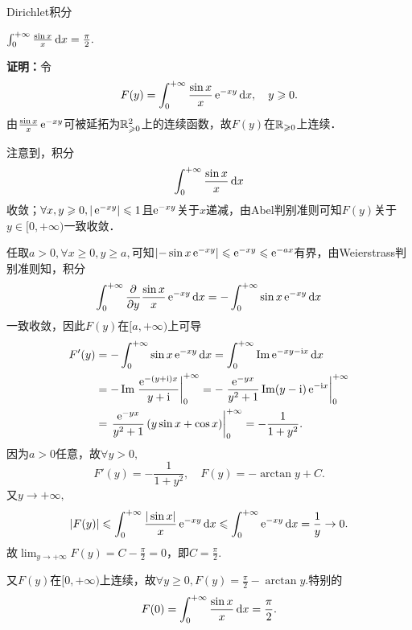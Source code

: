 \begin{example}{Dirichlet积分}{}
	\begin{center}
		$\int_0^{+\infty}\frac{\sin x}x\mathop{}\!\mathrm{d} x=\frac{\pi}2.$
	\end{center}
	\textbf{证明：}令
	\[
		F(y)=\int_0^{+\infty}\frac{\sin x}x\mathop{}\!\mathrm{e}^{-xy}\mathop{}\!\mathrm{d} x,\quad y\geqslant 0.
	\]
	由$\frac{\sin x}x\mathop{}\!\mathrm{e}^{-xy}$可被延拓为$\mathbb R_{\geqslant 0}^2$上的连续函数，故$F(y)$在$\mathbb R_{\geqslant 0}$上连续．

	注意到，积分
	\[
		\int_0^{+\infty}\frac{\sin x}x\mathop{}\!\mathrm{d} x
	\]
	收敛；$\forall x,y\geqslant 0,|\mathop{}\!\mathrm{e}^{-xy}|\leqslant 1$且$\mathop{}\!\mathrm{e}^{-xy}$关于$x$递减，由Abel判别准则可知$F(y)$关于$y\in[0,+\infty)$一致收敛．

	任取$a>0,\forall x\geqslant 0,y\geqslant a,$可知$\left|-\sin x\mathop{}\!\mathrm{e}^{-xy}\right|\leqslant \mathop{}\!\mathrm{e}^{-xy}\leqslant \mathop{}\!\mathrm{e}^{-ax}$有界，由Weierstrass判别准则知，积分
	\[
		\int_0^{+\infty}\frac{\partial^{{}}}{\partial{y}^{{}}}\frac{\sin x}x\mathop{}\!\mathrm{e}^{-xy}\mathop{}\!\mathrm{d} x=-\int_0^{+\infty}\sin x\mathop{}\!\mathrm{e}^{-xy}\mathop{}\!\mathrm{d} x
	\]
	一致收敛，因此$F(y)$在$[a,+\infty)$上可导
	\begin{align*}
		F'(y) & =-\int\zti\sin x\e{-xy}\d x=\int\zti\Im\e{-xy-\i x}\d x                                                \\
			  & =-\Im\left.\frac{\e{-(y+\i)x}}{y+\i}\right|\zti=-\left.\frac{\e{-yx}}{y^2+1}\Im(y-\i)\e{-\i x}\right|\zti \\
			  & =\left.\frac{\e{-yx}}{y^2+1}\left(y\sin x+\cos x\right)\right|\zti=-\frac1{1+y^2}.
	\end{align*}
	因为$a>0$任意，故$\forall y>0,$
	\[
		F'(y)=-\frac1{1+y^2},\quad F(y)=-\arctan y+C.
	\]
	又$y\to+\infty,$
	\[
		|F(y)|\leqslant\int_0^{+\infty}\frac{|\sin x|}x\mathop{}\!\mathrm{e}^{-xy}\mathop{}\!\mathrm{d} x\leqslant\int_0^{+\infty}\mathop{}\!\mathrm{e}^{-xy}\mathop{}\!\mathrm{d} x=\frac1y\to0.
	\]
	故$\lim_{y\to+\infty}F(y)=C-\frac{\pi}2=0$，即$C=\frac{\pi}2.$

	又$F(y)$在$[0,+\infty)$上连续，故$\forall y\geqslant 0,F(y)=\frac{\pi}2-\arctan y.$特别的
	\[
		F(0)=\int_0^{+\infty}\frac{\sin x}x\mathop{}\!\mathrm{d} x=\frac{\pi}2.
	\]
\end{example}
\newpage
